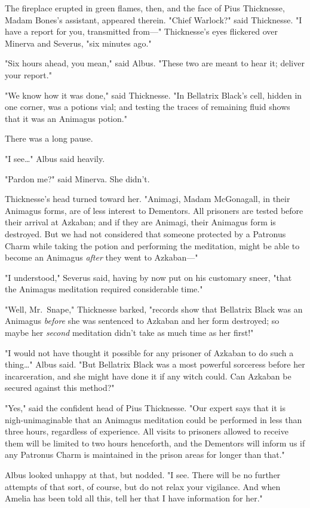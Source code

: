 The fireplace erupted in green flames, then, and the face of Pius Thicknesse,
Madam Bones's assistant, appeared therein. "Chief Warlock?" said Thicknesse. "I
have a report for you, transmitted from---" Thicknesse's eyes flickered over
Minerva and Severus, "six minutes ago."

"Six hours ahead, you mean," said Albus. "These two are meant to hear it;
deliver your report."

"We know how it was done," said Thicknesse. "In Bellatrix Black's cell, hidden
in one corner, was a potions vial; and testing the traces of remaining fluid
shows that it was an Animagus potion."

There was a long pause.

"I see{\ldots}" Albus said heavily.

"Pardon me?" said Minerva. She didn't.

Thicknesse's head turned toward her. "Animagi, Madam McGonagall, in their
Animagus forms, are of less interest to Dementors. All prisoners are tested
before their arrival at Azkaban; and if they are Animagi, their Animagus form
is destroyed. But we had not considered that someone protected by a Patronus
Charm while taking the potion and performing the meditation, might be able to
become an Animagus \emph{after} they went to Azkaban---"

"I understood," Severus said, having by now put on his customary sneer, "that
the Animagus meditation required considerable time."

"Well, Mr.~Snape," Thicknesse barked, "records show that Bellatrix Black was an
Animagus \emph{before} she was sentenced to Azkaban and her form destroyed; so
maybe her \emph{second} meditation didn't take as much time as her first!"

"I would not have thought it possible for any prisoner of Azkaban to do such a
thing{\ldots}" Albus said. "But Bellatrix Black was a most powerful sorceress
before her incarceration, and she might have done it if any witch could. Can
Azkaban be secured against this method?"

"Yes," said the confident head of Pius Thicknesse. "Our expert says that it is
nigh-unimaginable that an Animagus meditation could be performed in less than
three hours, regardless of experience. All visits to prisoners allowed to
receive them will be limited to two hours henceforth, and the Dementors will
inform us if any Patronus Charm is maintained in the prison areas for longer
than that."

Albus looked unhappy at that, but nodded. "I see. There will be no further
attempts of that sort, of course, but do not relax your vigilance. And when
Amelia has been told all this, tell her that I have information for her."

